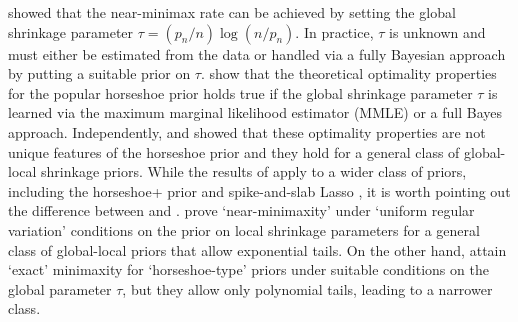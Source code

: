 \documentclass[sts,preprint]{imsart}
\begin{document}
\citet{van2014horseshoe} showed that the near-minimax rate can be achieved by setting the global shrinkage parameter $\tau = (p_n/n) \log(n/p_n)$. In practice, $\tau$ is unknown and must either be estimated from the data or handled via a fully Bayesian approach by putting a suitable prior on $\tau$. \cite{van2017adaptive} show that the theoretical optimality properties for the popular horseshoe prior holds true if the global shrinkage parameter $\tau$ is learned via the maximum marginal likelihood estimator (MMLE) or a full Bayes approach. 
Independently, \citet{van2015conditions} and \citet{ghosh2016asymptotic} showed that these optimality properties are not unique features of the horseshoe prior and they hold for a general class of global-local shrinkage priors. While the results of \cite{van2015conditions} apply to a wider class of priors, including the horseshoe+ prior \citep{bhadra2015horseshoe+} and spike-and-slab Lasso \citep{rovckova2016spike}, it is worth pointing out the difference between \citet{van2015conditions} and \citet{ghosh2016asymptotic}. \citet{van2015conditions} prove `near-minimaxity' under `uniform regular variation' conditions on the prior on local shrinkage parameters for a general class of global-local priors that allow exponential tails. On the other hand, \citet{ghosh2016asymptotic} attain `exact' minimaxity for `horseshoe-type' priors under suitable conditions on the global parameter $\tau$, but they allow only polynomial tails, leading to a narrower class.

%

\end{document}
